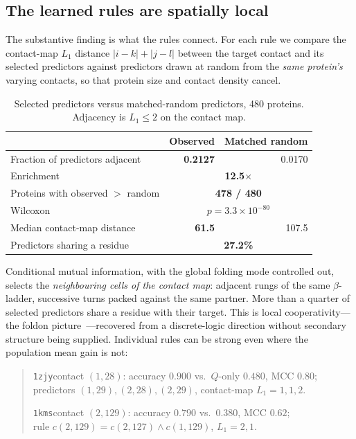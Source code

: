 \subsection{The learned rules are spatially local}
\label{sec:cl-local}

The substantive finding is what the rules connect.  For each rule we compare
the contact-map $L_1$ distance $|i-k| + |j-l|$ between the target contact and
its selected predictors against predictors drawn at random from the
\emph{same protein's} varying contacts, so that protein size and contact
density cancel.

\begin{table}[htbp]
\centering
\caption{Selected predictors versus matched-random predictors, 480 proteins.
Adjacency is $L_1 \leq 2$ on the contact map.}
\label{tab:cl-locality}
\begin{tabular}{lrr}
\toprule
 & Observed & Matched random \\
\midrule
Fraction of predictors adjacent      & \textbf{0.2127} & 0.0170 \\
Enrichment                           & \multicolumn{2}{c}{\textbf{12.5$\times$}} \\
Proteins with observed $>$ random    & \multicolumn{2}{c}{\textbf{478 / 480}} \\
Wilcoxon                             & \multicolumn{2}{c}{$p = 3.3\times10^{-80}$} \\
Median contact-map distance          & \textbf{61.5} & 107.5 \\
Predictors sharing a residue         & \multicolumn{2}{c}{\textbf{27.2\%}} \\
\bottomrule
\end{tabular}
\end{table}

Conditional mutual information, with the global folding mode controlled out,
selects the \emph{neighbouring cells of the contact map}: adjacent rungs of the
same $\beta$-ladder, successive turns packed against the same partner.  More
than a quarter of selected predictors share a residue with their target.  This
is local cooperativity---the foldon picture~\cite{maity2005foldons}---recovered
from a discrete-logic direction without secondary structure being supplied.
Individual rules can be strong even where the population mean gain is not:

\begin{quote}\small
\texttt{1zjy}\quad contact $(1,28)$: accuracy $0.900$ vs.\ $Q$-only $0.480$, MCC $0.80$;\\
\quad predictors $(1,29), (2,28), (2,29)$, contact-map $L_1 = 1, 1, 2$.

\texttt{1kms}\quad contact $(2,129)$: accuracy $0.790$ vs.\ $0.380$, MCC $0.62$;\\
\quad rule $c(2,129) = c(2,127) \wedge c(1,129)$, $L_1 = 2, 1$.
\end{quote}

